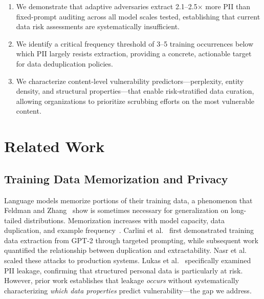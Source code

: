 \documentclass[conference]{IEEEtran}
\begin{document}
\begin{enumerate}
\item We demonstrate that adaptive adversaries extract 2.1--2.5$\times$ more PII than fixed-prompt auditing across all model scales tested, establishing that current data risk assessments are systematically insufficient.

\item We identify a critical frequency threshold of 3--5 training occurrences below which PII largely resists extraction, providing a concrete, actionable target for data deduplication policies.

\item We characterize content-level vulnerability predictors---perplexity, entity density, and structural properties---that enable risk-stratified data curation, allowing organizations to prioritize scrubbing efforts on the most vulnerable content.
\end{enumerate}

\section{Related Work}
\label{sec:related}

\subsection{Training Data Memorization and Privacy}

Language models memorize portions of their training data, a phenomenon that Feldman and Zhang~\cite{feldman2020neural} show is sometimes necessary for generalization on long-tailed distributions. Memorization increases with model capacity, data duplication, and example frequency~\cite{tirumala2022memorization, carlini2022quantifying}. Carlini et al.~\cite{carlini2021extracting} first demonstrated training data extraction from GPT-2 through targeted prompting, while subsequent work~\cite{carlini2023quantifying} quantified the relationship between duplication and extractability. Nasr et al.~\cite{nasr2023scalable} scaled these attacks to production systems. Lukas et al.~\cite{lukas2023analyzing} specifically examined PII leakage, confirming that structured personal data is particularly at risk. However, prior work establishes that leakage \emph{occurs} without systematically characterizing \emph{which data properties} predict vulnerability---the gap we address.
\end{document}
